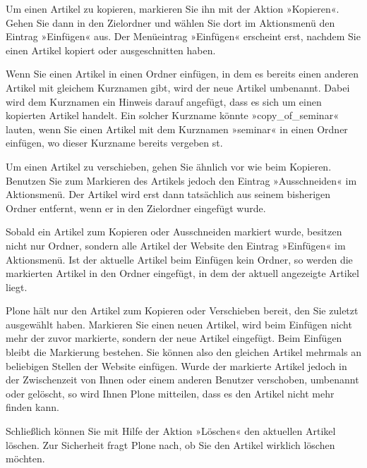 \documentclass[a4paper,12pt,ngerman]{manual}
\begin{document}
Um einen Artikel zu kopieren, markieren Sie ihn mit der Aktion
»Kopieren«.  Gehen Sie dann in den Zielordner und wählen Sie dort im
Aktionsmenü den Eintrag »Einfügen« aus. Der Menüeintrag »Einfügen«
erscheint erst, nachdem Sie einen Artikel kopiert oder ausgeschnitten
haben.

Wenn Sie einen Artikel in einen Ordner einfügen, in dem es bereits
einen anderen Artikel mit gleichem Kurznamen gibt, wird der neue
Artikel umbenannt. Dabei wird dem Kurznamen ein Hinweis darauf
angefügt, dass es sich um einen kopierten Artikel handelt. Ein solcher
Kurzname könnte »copy\_of\_seminar« lauten, wenn Sie einen Artikel mit
dem Kurznamen »seminar« in einen Ordner einfügen, wo dieser Kurzname
bereits vergeben st.

Um einen Artikel zu verschieben, gehen Sie ähnlich vor wie beim Kopieren.
Benutzen Sie zum Markieren des Artikels jedoch den Eintrag »Ausschneiden« im
Aktionsmenü. Der Artikel wird erst dann tatsächlich aus seinem bisherigen
Ordner entfernt, wenn er in den Zielordner eingefügt wurde.

Sobald ein Artikel zum Kopieren oder Ausschneiden markiert wurde,
besitzen nicht nur Ordner, sondern alle Artikel der Website den
Eintrag »Einfügen« im Aktionsmenü. Ist der aktuelle Artikel beim
Einfügen kein Ordner, so werden die markierten Artikel in den Ordner
eingefügt, in dem der aktuell angezeigte Artikel liegt.

Plone hält nur den Artikel zum Kopieren oder Verschieben bereit, den Sie
zuletzt ausgewählt haben. Markieren Sie einen neuen Artikel, wird beim
Einfügen nicht mehr der zuvor markierte, sondern der neue Artikel eingefügt.
Beim Einfügen bleibt die Markierung bestehen. Sie können also den gleichen
Artikel mehrmals an beliebigen Stellen der Website einfügen. Wurde der
markierte Artikel jedoch in der Zwischenzeit von Ihnen oder einem anderen
Benutzer verschoben, umbenannt oder gelöscht, so wird Ihnen Plone mitteilen,
dass es den Artikel nicht mehr finden kann.

Schließlich können Sie mit Hilfe der Aktion »Löschen« den aktuellen Artikel
löschen. Zur Sicherheit fragt Plone nach, ob Sie den Artikel wirklich löschen
möchten.
\end{document}
